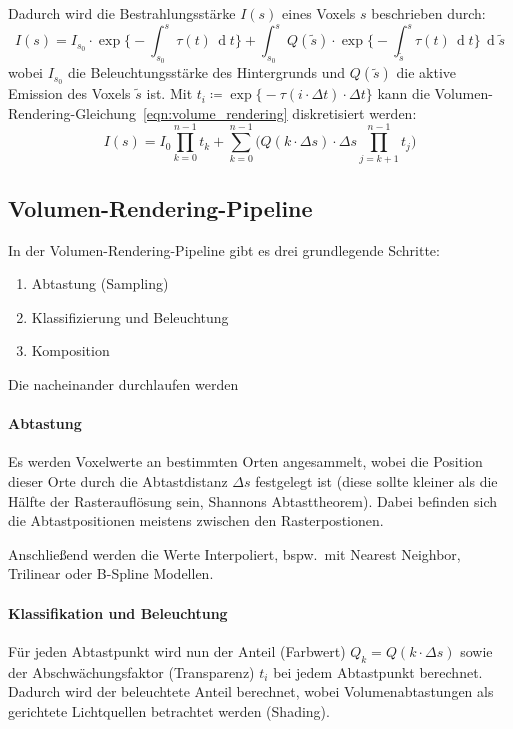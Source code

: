 \documentclass[a4paper, 11pt, accentcolor = tud3b]{tudreport}
\DeclareMathOperator{\total}{d}
\newcommand{\dif}[1]{\,\total#1}
\newcommand{\bspw}{bspw.~}
\begin{document}
				Dadurch wird die Bestrahlungsstärke \( I(s) \) eines Voxels \(s\) beschrieben durch:
				\begin{equation}
					I(s) = I_{s_0} \cdot \exp \Bigg\{ -\int_{s_0}^{s} \! \tau(t) \dif{t} \Bigg\} + \int_{s_0}^{s} \! Q(\tilde{s}) \cdot \exp \Bigg\{ -\int_{\tilde{s}}^{s} \tau(t) \dif{t} \Bigg\} \dif{\tilde{s}}  \label{eqn:volume_rendering}
				\end{equation}
				wobei \( I_{s_0} \) die Beleuchtungsstärke des Hintergrunds und \( Q(\tilde{s}) \) die aktive Emission des Voxels \( \tilde{s} \) ist. Mit \( t_i \coloneqq \exp\Big\{ -\tau(i \cdot \Delta t) \cdot \Delta t \Big\} \) kann die Volumen-Rendering-Gleichung~\ref{eqn:volume_rendering} diskretisiert werden:
				\begin{equation}
					I(s) = I_0 \prod_{k = 0}^{n - 1} t_k + \sum_{k = 0}^{n - 1} \Bigg( Q(k \cdot \Delta s) \cdot \Delta s \prod_{j = k + 1}^{n - 1} t_j \Bigg)  \label{eqn:volume_rendering_discrete}
				\end{equation}

			\subsection{Volumen-Rendering-Pipeline}
				In der Volumen-Rendering-Pipeline gibt es drei grundlegende Schritte:
				\begin{enumerate}
					\item Abtastung (Sampling)
					\item Klassifizierung und Beleuchtung
					\item Komposition
				\end{enumerate}
				Die nacheinander durchlaufen werden
	
				\paragraph{Abtastung}
					Es werden Voxelwerte an bestimmten Orten angesammelt, wobei die Position dieser Orte durch die Abtastdistanz \( \Delta s \) festgelegt ist (diese sollte kleiner als die Hälfte der Rasterauflösung sein, Shannons Abtasttheorem). Dabei befinden sich die Abtastpositionen meistens zwischen den Rasterpostionen.
					
					Anschließend werden die Werte Interpoliert, \bspw mit Nearest Neighbor, Trilinear oder B-Spline Modellen.
	
				\paragraph{Klassifikation und Beleuchtung}
					Für jeden Abtastpunkt wird nun der Anteil (Farbwert) \( Q_k = Q(k \cdot \Delta s) \) sowie der Abschwächungsfaktor (Transparenz) \( t_i \) bei jedem Abtastpunkt berechnet. Dadurch wird der beleuchtete Anteil berechnet, wobei Volumenabtastungen als gerichtete Lichtquellen betrachtet werden (Shading).
	
\end{document}
